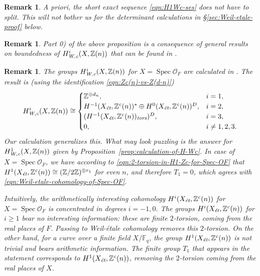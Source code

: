 \documentclass[draft]{article}
\DeclareMathOperator{\Spec}{Spec}
\newcommand{\FF}{\mathbb{F}}
\newcommand{\ZZ}{\mathbb{Z}}
\newcommand{\et}{\text{\it \'{e}t}}
\newcommand{\tors}{\text{\it tors}}
\newcommand{\Wc}{\text{\it W,c}}
\theoremstyle{myplain}
\theoremstyle{mydefinition}
\newtheorem{remark}[theorem]{Remark}
\numberwithin{equation}{section}
\begin{document}
\begin{remark}
  A priori, the short exact sequence \eqref{eqn:H1Wc-ses} does not have to
  split. This will not bother us for the determinant calculations in
  \S\ref{sec:Weil-etale-proof} below.
\end{remark}

\begin{remark}
  Part 0) of the above proposition is a consequence of general results on
  boundedness of $H^i_\Wc (X,\ZZ(n))$ that can be found in
  \cite[\S 7]{Beshenov-Weil-etale-1}.
\end{remark}

\begin{remark}
  The groups $H^i_\Wc (X, \ZZ(n))$ for $X = \Spec \mathcal{O}_F$ are calculated
  in \cite[\S 5.8.3]{Flach-Morin-2018}. The result is (using the identification
  \eqref{eqn:Zc(n)-vs-Z(d-n)})
  \begin{equation}
    \label{eqn:Weil-etale-cohomology-of-Spec-OF}
    H^i_\Wc (X, \ZZ(n)) \cong
    \begin{cases}
      \ZZ^{\oplus d_n}, & i = 1, \\
      H^{-1} (X_\et, \ZZ^c (n))^* \oplus H^0 (X_\et, \ZZ^c (n))^D, & i = 2, \\
      (H^{-1} (X_\et, \ZZ^c (n))_\tors)^D, & i = 3, \\
      0, & i \ne 1,2,3.
    \end{cases}
  \end{equation}
  Our calculation generalizes this. What may look puzzling is the answer for
  $H^1_\Wc (X,\ZZ(n))$ given by Proposition~\ref{prop:calculation-of-H-Wc}. In
  case of $X = \Spec \mathcal{O}_F$, we have according to
  \eqref{eqn:2-torsion-in-H1-Zc-for-Spec-OF} that
  $H^1 (X_\et, \ZZ^c(n)) \cong (\ZZ/2\ZZ)^{\oplus r_1}$ for even $n$, and
  therefore $T_1 = 0$, which agrees with
  \eqref{eqn:Weil-etale-cohomology-of-Spec-OF}.

  Intuitively, the arithmetically interesting cohomology $H^i (X_\et, \ZZ^c(n))$
  for $X = \Spec \mathcal{O}_F$ is concentrated in degrees $i = -1,0$. The
  groups $H^i (X_\et, \ZZ^c (n))$ for $i \ge 1$ bear no interesting information:
  these are finite $2$-torsion, coming from the real places of $F$. Passing to
  Weil-\'{e}tale cohomology removes this $2$-torsion. On the other hand, for a curve
  over a finite field $X/\FF_q$, the group $H^1 (X_\et, \ZZ^c (n))$ is not
  trivial and bears arithmetic information. The finite group $T_1$ that appears
  in the statement corresponds to $H^1 (X_\et, \ZZ^c (n))$, removing the
  $2$-torsion coming from the real places of $X$.
\end{remark}
\end{document}

